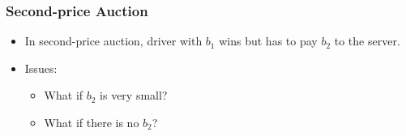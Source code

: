 \documentclass[t]{beamer}
\begin{document}
\begin{frame}\frametitle{Second-price Auction}
\begin{itemize}
\item In second-price auction, driver with $b_1$ wins but has to pay $b_2$ to the server.
\item<2-> Issues:
\begin{itemize}
\item<2-> What if $b_2$ is very small?
\item<3-> What if there is no $b_2$?
\end{itemize}
\end{itemize}
\end{frame}
\end{document}
